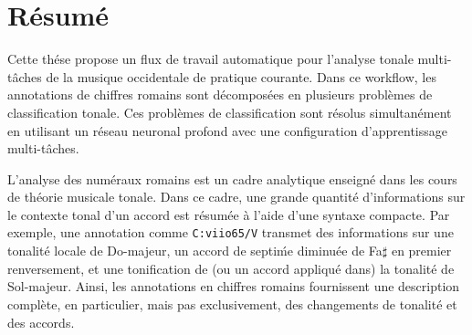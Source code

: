 \chapter*{R\'esum\'e}
\label{chap:chap0-res}

Cette th\'ese propose un flux de travail automatique pour l'analyse tonale multi-t\^aches de la musique occidentale de pratique courante. 
Dans ce workflow, les annotations de chiffres romains sont d\'ecompos\'ees en plusieurs probl\`emes de classification tonale. 
Ces probl\`emes de classification sont r\'esolus simultan\'ement en utilisant un r\'eseau neuronal profond avec une configuration d'apprentissage multi-t\^aches.

L'analyse des num\'eraux romains est un cadre analytique enseign\'e dans les cours de th\'eorie musicale tonale.
Dans ce cadre, une grande quantit\'e d'informations sur le contexte tonal d'un accord est r\'esum\'ee à l'aide d'une syntaxe compacte. 
Par exemple, une annotation comme \texttt{C:viio65/V} transmet des informations sur une tonalit\'e locale de Do-majeur, un accord de septi\'me diminu\'ee de Fa$\sharp$ en premier renversement, et une tonification de (ou un accord appliqu\'e dans) la tonalit\'e de Sol-majeur.
Ainsi, les annotations en chiffres romains fournissent une description compl\`ete, en particulier, mais pas exclusivement, des changements de tonalit\'e et des accords.